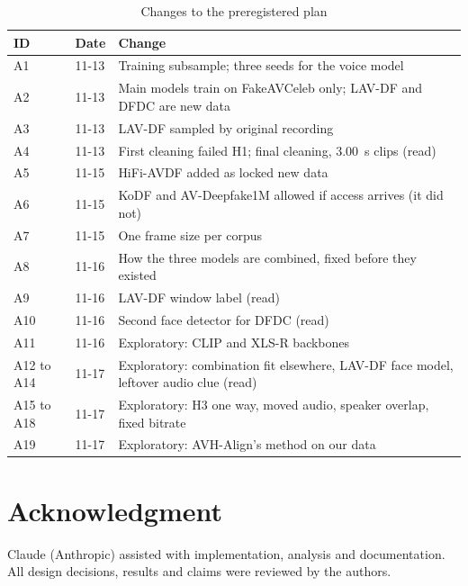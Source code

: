 \documentclass[conference]{IEEEtran}
\begin{document}
\begin{table}[htbp]
\caption{Changes to the preregistered plan}
\label{tab:changes}
\centering
\small
\begin{tabular}{llp{5.2cm}}
\toprule
ID & Date & Change \\
\midrule
A1 & 11-13 & Training subsample; three seeds for the voice model \\
A2 & 11-13 & Main models train on FakeAVCeleb only; LAV-DF and DFDC are new data \\
A3 & 11-13 & LAV-DF sampled by original recording \\
A4 & 11-13 & First cleaning failed H1; final cleaning, 3.00~s clips (read) \\
A5 & 11-15 & HiFi-AVDF added as locked new data \\
A6 & 11-15 & KoDF and AV-Deepfake1M allowed if access arrives (it did not) \\
A7 & 11-15 & One frame size per corpus \\
A8 & 11-16 & How the three models are combined, fixed before they existed \\
A9 & 11-16 & LAV-DF window label (read) \\
A10 & 11-16 & Second face detector for DFDC (read) \\
A11 & 11-16 & Exploratory: CLIP and XLS-R backbones \\
A12 to A14 & 11-17 & Exploratory: combination fit elsewhere, LAV-DF face model, leftover audio clue (read) \\
A15 to A18 & 11-17 & Exploratory: H3 one way, moved audio, speaker overlap, fixed bitrate \\
A19 & 11-17 & Exploratory: AVH-Align's method on our data \\
\bottomrule
\end{tabular}
\end{table}

\section*{Acknowledgment}

Claude (Anthropic) assisted with implementation, analysis and documentation.
All design decisions, results and claims were reviewed by the authors.
\end{document}
